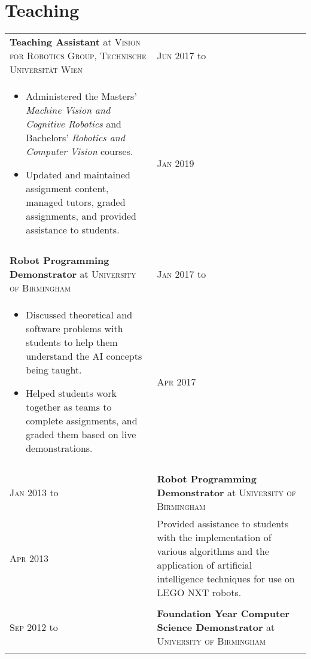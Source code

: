 \documentclass[a4paper,10pt]{article}
\newcommand{\datelen}{1.8cm}
\newcommand{\descrlen}{15.5cm}
\begin{document}
\section{Teaching}
\begin{tabular}{p{\descrlen}|p{\datelen}}
  \textbf{Teaching Assistant} at \textsc{Vision for Robotics Group, Technische Universit{\"a}t Wien}&\textsc{Jun 2017} to\\
  \small{
  \vspace{-0.4cm}
  \begin{itemize}
  \item Administered the Masters' \emph{Machine Vision and Cognitive Robotics} and Bachelors' \emph{Robotics and Computer Vision} courses.
  \item Updated and maintained assignment content, managed tutors, graded assignments, and provided assistance to students.
  \vspace{-1cm}
  \end{itemize}}&\textsc{Jan 2019}\\\multicolumn{2}{c}{}\\[-0.2cm]
  \textbf{Robot Programming Demonstrator} at \textsc{University of Birmingham} & \textsc{Jan 2017} to\\
  \small{
  \vspace{-0.4cm}
  \begin{itemize}
  \item Discussed theoretical and software problems with students to help them understand the AI concepts being taught.
  \item Helped students work together as teams to complete assignments, and graded them based on live demonstrations.
  \vspace{-0.5cm}
  \end{itemize}} & \textsc{Apr 2017}
  \begin{comment}
  \\\multicolumn{2}{c}{}\\[-0.2cm]
  \textsc{Jan 2013} to& \textbf{Robot Programming Demonstrator} at \textsc{University of Birmingham}\\
  \textsc{Apr 2013}&\footnotesize{Provided assistance to students with the implementation of various algorithms and the application of artificial intelligence techniques for use on LEGO NXT robots.}\\\multicolumn{2}{c}{}\\[-0.2cm]
  \textsc{Sep 2012} to& \textbf{Foundation Year Computer Science Demonstrator} at \textsc{University of Birmingham}\\

\end{comment}
\end{tabular}
\end{document}
